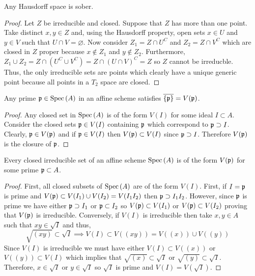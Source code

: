 \documentclass[12pt]{article}
\begin{document}
\begin{proposition}
Any Hausdorff space is sober.
\end{proposition}

\begin{proof}
Let $Z$ be irreducible and closed. Suppose that $Z$ has more than one point. Take distinct $x, y \in Z$ and, using the Hausdorff property, open sets $x \in U$ and $y \in V$ such that $U \cap V = \varnothing$. Now consider $Z_1 = Z \cap U^C$ and $Z_2 = Z \cap V^C$ which are closed in $Z$ proper because $x \notin Z_1$ and $y \notin Z_2$. Furthermore, $Z_1 \cup Z_2 = Z \cap (U^C \cup V^C) = Z \cap (U \cap V)^C = Z$ so $Z$ cannot be irreducble. Thus, the only irreducible sets are points which clearly have a unique generic point because all points in a $T_2$ space are closed.
\end{proof}

\begin{lemma}
Any prime $\mathfrak{p} \in \mathrm{Spec}\left( A \right)$ in an affine scheme satisfies $\overline{\{\mathfrak{p}\}} = V(\mathfrak{p})$. 
\end{lemma}

\begin{proof}
Any closed set in $\mathrm{Spec}\left( A \right)$ is of the form $V(I)$ for some ideal $I \subset A$. Consider the closed sets $\mathfrak{p} \in V(I)$ containing $\mathfrak{p}$ which correspond to $\mathfrak{p} \supset I$. Clearly, $\mathfrak{p} \in V(\mathfrak{p})$ and if $\mathfrak{p} \in V(I)$ then $V(\mathfrak{p}) \subset V(I)$ since $\mathfrak{p} \supset I$. Therefore $V(\mathfrak{p})$ is the closure of $\mathfrak{p}$.
\end{proof}

\begin{lemma}
Every closed irreducible set of an affine scheme $\mathrm{Spec}\left( A \right)$ is of the form $V(\mathfrak{p})$ for some prime $\mathfrak{p} \subset A$. 
\end{lemma}

\begin{proof}
First, all closed subsets of $\mathrm{Spec}\left( A \right)$ are of the form $V(I)$. First, if $I = \mathfrak{p}$ is prime and $V(\mathfrak{p}) \subset V(I_1) \cup V(I_2) = V(I_1 I_2)$ then $\mathfrak{p} \supset I_1 I_2$. However, since $\mathfrak{p}$ is prime we have either $\mathfrak{p} \supset I_1$ or $\mathfrak{p} \subset I_2$ so $V(\mathfrak{p}) \subset V(I_1)$ or $V(\mathfrak{p}) \subset V(I_2)$ proving that $V(\mathfrak{p})$ is irreducible. Conversely, if $V(I)$ is irreducible then take $x, y \in A$ such that $xy \in \sqrt{I}$ and thus,
\[ \sqrt{(xy)} \subset \sqrt{I} \implies V(I) \subset V((xy)) = V((x)) \cup V((y)) \]
Since $V(I)$ is irreducible we must have either $V(I) \subset V((x))$ or $V((y)) \subset V(I)$ which implies that $\sqrt{(x)} \subset \sqrt{I}$ or $\sqrt{(y)} \subset \sqrt{I}$. Therefore, $x \in \sqrt{I}$ or $y \in \sqrt{I}$ so $\sqrt{I}$ is prime and $V(I) = V(\sqrt{I})$.  
\end{proof}
\end{document}
